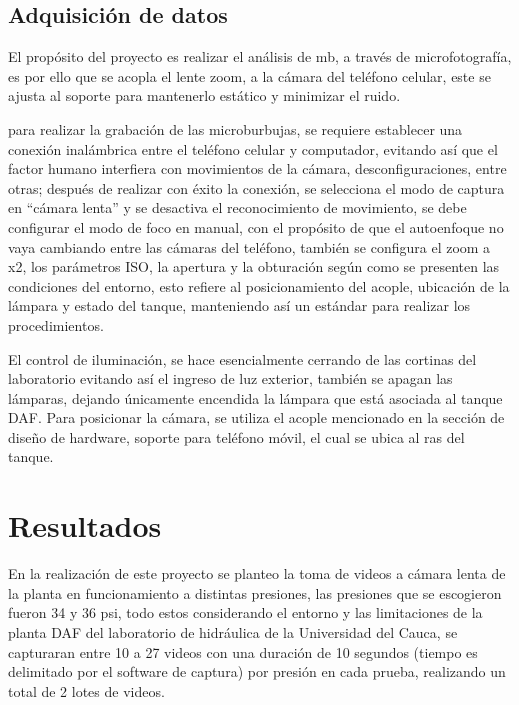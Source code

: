\documentclass[12pt,twocolumn,a4paper]{article}
\begin{document}
\subsection{Adquisición de datos}

El propósito del proyecto es realizar el análisis de mb, a través de microfotografía, es por ello que se acopla el lente zoom, a la cámara del teléfono celular, este se ajusta al soporte para mantenerlo estático y minimizar el ruido.

para realizar la grabación de las microburbujas, se requiere establecer una conexión inalámbrica entre el teléfono celular y computador, evitando así que el factor humano interfiera  con movimientos de la cámara, desconfiguraciones, entre otras; después de realizar con éxito la conexión,  se selecciona el modo de captura en “cámara lenta” y se desactiva el reconocimiento de movimiento, se debe configurar el modo de foco en manual, con el propósito de que el autoenfoque no vaya cambiando entre las cámaras del teléfono, también se configura el zoom a x2, los parámetros ISO, la apertura y la obturación según como se presenten las condiciones del entorno, esto refiere al posicionamiento del acople, ubicación de la lámpara y estado del tanque, manteniendo así un estándar para realizar los procedimientos.

El control de iluminación, se hace esencialmente cerrando de las cortinas del laboratorio evitando así el ingreso de luz exterior, también se apagan las lámparas, dejando únicamente encendida la lámpara que está asociada al tanque DAF. Para posicionar la cámara, 
se utiliza el acople mencionado en la sección de diseño de hardware, soporte para teléfono móvil, el cual se ubica al ras del tanque.



\section{Resultados}

En la realización de este proyecto se planteo la toma de videos a cámara lenta de la planta en funcionamiento a distintas presiones, las presiones que se escogieron fueron 34 y 36 psi, todo estos considerando el entorno y las limitaciones de la planta DAF del laboratorio de hidráulica de la Universidad del Cauca, se capturaran entre 10 a 27 videos con una duración de 10 segundos (tiempo es delimitado por el software de captura) por presión en cada prueba, realizando un total de 2 lotes de videos.
\end{document}
